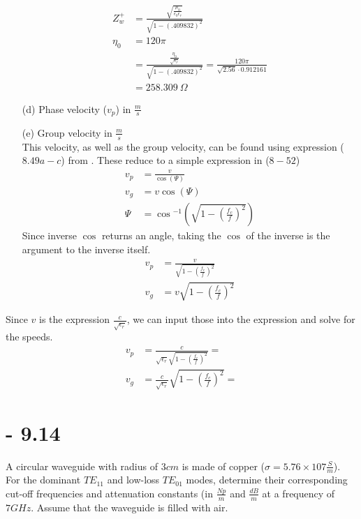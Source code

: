 \documentclass[12pt]{article}
\begin{document}
\begin{itemize}
\begin{align*}
    Z_w^+ &= \frac{\sqrt{\frac{\mu_0}{\epsilon_0\epsilon_r}}}{\sqrt{1-\left(.409832\right)^2}} \\
    \eta_0 &= 120\pi\\
          &= \frac{\frac{\eta_0}{\sqrt{\epsilon_r}}}{\sqrt{1-\left(.409832\right)^2}} = \frac{120\pi}{\sqrt{2.56}\cdot 0.912161}\\
    &= 258.309\ \Omega
  \end{align*}
\item[(d)] Phase velocity ($v_p$) in $\frac{m}{s}$
\item[(e)] Group velocity in $\frac{m}{s}$ \\
  This velocity, as well as the group velocity, can be found using expression ($8.49a-c$) from \cite{balanis_2012}. These reduce to a simple expression in ($8-52$) 
  \begin{align*}
    v_p &= \frac{v}{\cos{(\Psi)}}\\
    v_g &= v\cos{(\Psi)}\\
    \Psi &= \cos{^{-1}\left(\sqrt{1-\left(\frac{f_c}{f}\right)^2}\right)}
  \end{align*}
  Since inverse $\cos$ returns an angle, taking the $\cos$ of the inverse is the argument to the inverse itself.
  \begin{align*}
    v_p &= \frac{v}{\sqrt{1-\left(\frac{f_c}{f}\right)^2}}\\
    v_g &= v\sqrt{1-\left(\frac{f_c}{f}\right)^2}
  \end{align*}
\end{itemize}
\newpage
\noindent
Since $v$ is the expression $\frac{c}{\sqrt{\epsilon_r}}$, we can input those into the expression and solve for the speeds.
  \begin{align*}
    v_p &= \frac{c}{\sqrt{\epsilon_r}\sqrt{1-\left(\frac{f_c}{f}\right)^2}} = \\
    v_g &= \frac{c}{\sqrt{\epsilon_r}}\sqrt{1-\left(\frac{f_c}{f}\right)^2} = 
  \end{align*}

\section{- 9.14}
A circular waveguide with radius of $3 cm$ is made of copper ($\sigma = 5.76 × 107 \frac{S}{m}$). For the dominant $TE_{11}$ and low-loss $TE_{01}$ modes, determine their corresponding cut-off frequencies and attenuation constants (in $\frac{Np}{m}$ and $\frac{dB}{m}$ at a frequency of $7 GHz$. Assume that the waveguide is filled with air.
\newpage
\end{document}
